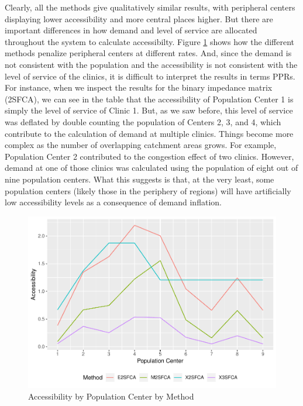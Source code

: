 \documentclass[10pt,letterpaper]{article}
\begin{document}
Clearly, all the methods give qualitatively similar results, with
peripheral centers displaying lower accessibility and more central
places higher. But there are important differences in how demand and
level of service are allocated throughout the system to calculate
accessibilty. Figure \ref{fig:fig9-comparison} shows how the different
methods penalize peripheral centers at different rates. And, since the
demand is not consistent with the population and the accessibility is
not consistent with the level of service of the clinics, it is difficult
to interpret the results in terms PPRs. For instance, when we inspect
the results for the binary impedance matrix (2SFCA), we can see in the
table that the accessibility of Population Center 1 is simply the level
of service of Clinic 1. But, as we saw before, this level of service was
deflated by double counting the population of Centers 2, 3, and 4, which
contribute to the calculation of demand at multiple clinics. Things
become more complex as the number of overlapping catchment areas grows.
For example, Population Center 2 contributed to the congestion effect of
two clinics. However, demand at one of those clinics was calculated
using the population of eight out of nine population centers. What this
suggests is that, at the very least, some population centers (likely
those in the periphery of regions) will have artificially low
accessibility levels as a consequence of demand inflation.

\begin{figure}
\includegraphics[width=0.95\linewidth]{Supply_and_Demand_Inflation_in_FCA_Methods_v2.1_files/figure-latex/fig9-comparison-1} \caption{\label{fig:fig9-comparison}Accessibility by Population Center by Method}\label{fig:fig9-comparison}
\end{figure}
\end{document}
